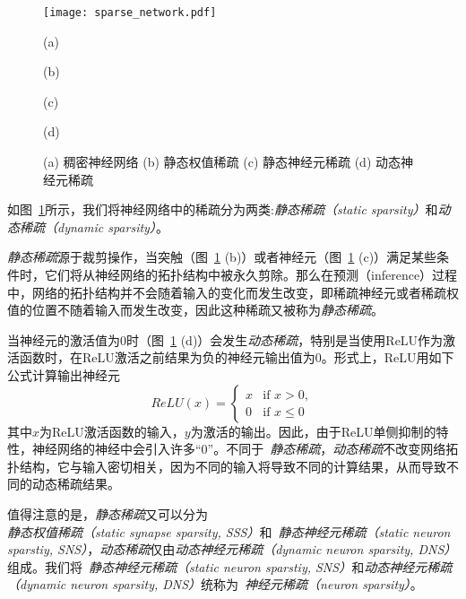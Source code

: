 \begin{figure}[h]
  \centering
  \begin{minipage}[t]{\columnwidth}
  \texttt{[image: sparse\_network.pdf]}
  \end{minipage}
  \vfill
  \begin{minipage}[t]{0.24\columnwidth}
      \centering\footnotesize
    (a)
  \end{minipage}
  \hfill
  \begin{minipage}[t]{0.24\columnwidth}
      \centering\footnotesize
    (b)
  \end{minipage}
  \hfill
  \begin{minipage}[t]{0.24\columnwidth}
      \centering\footnotesize
    (c)
  \end{minipage}
    \hfill
  \begin{minipage}[t]{0.24\columnwidth}
      \centering\footnotesize
    (d)
  \end{minipage}
  \caption{ (a) 稠密神经网络 (b) 静态权值稀疏 (c) 静态神经元稀疏 (d) 动态神经元稀疏}
  \label{fig:sparsity}
\end{figure}

如图~\ref{fig:sparsity}所示，我们将神经网络中的稀疏分为两类:\emph{静态稀疏（static sparsity）}和\emph{动态稀疏（dynamic sparsity）}。

\emph{静态稀疏}源于裁剪操作，当突触（图~\ref{fig:sparsity} (b)）或者神经元（图~\ref{fig:sparsity} (c)）满足某些条件时，它们将从神经网络的拓扑结构中被永久剪除。那么在预测（inference）过程中，网络的拓扑结构并不会随着输入的变化而发生改变，即稀疏神经元或者稀疏权值的位置不随着输入而发生改变，因此这种稀疏又被称为\emph{静态稀疏}。

当神经元的激活值为$0$时（图~\ref{fig:sparsity} (d)）会发生\emph{动态稀疏}，特别是当使用ReLU作为激活函数时，在ReLU激活之前结果为负的神经元输出值为$0$。形式上，ReLU用如下公式计算输出神经元
\begin{equation}
ReLU(x)=
\begin{cases}
x & \text{if } x > 0, \\
0 & \text{if } x \leq 0
\end{cases}
\end{equation}
其中$x$为ReLU激活函数的输入，$y$为激活的输出。因此，由于ReLU单侧抑制的特性，神经网络的神经中会引入许多“0”。不同于~\emph{静态稀疏}，\emph{动态稀疏}不改变网络拓扑结构，它与输入密切相关，因为不同的输入将导致不同的计算结果，从而导致不同的动态稀疏结果。

值得注意的是，\emph{静态稀疏}又可以分为\emph{静态权值稀疏（static synapse sparsity, SSS）}和~\emph{静态神经元稀疏（static neuron sparstiy, SNS）}，\emph{动态稀疏}仅由\emph{动态神经元稀疏（dynamic neuron sparsity, DNS）}组成。我们将~\emph{静态神经元稀疏（static neuron sparstiy, SNS）}和\emph{动态神经元稀疏（dynamic neuron sparsity, DNS）}统称为~\emph{神经元稀疏（neuron sparsity）}。

